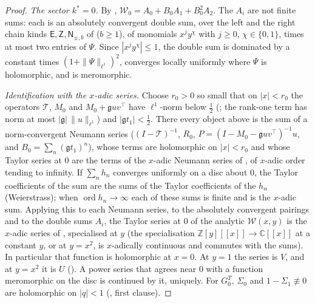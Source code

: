 \documentclass[11pt]{article}
\theoremstyle{plain}
\theoremstyle{definition}
\theoremstyle{remark}
\newcommand{\Z}{\mathbb{Z}}
\newcommand{\C}{\mathbb{C}}
\theoremstyle{plain}\newtheorem*{maintheorem}{Main Theorem}
\begin{document}
\begin{proof}
\emph{The sector $k^\ast=0$.} By {\cite[Remark ``the regrouping of $\mathcal W_0$'', \textup{M3:rem:W0regroup}]{Bonfioli2026bB}},
$\mathcal W_0=A_0+B_0A_1+B_0^2A_2$. The $A_i$ are not finite sums: each is an absolutely convergent
double sum, over the left and the right chain kinds $\mathsf E,\mathsf Z,\mathsf N_{\pm,b}$ of
{\cite[\textup{(eq:app-W0)}]{Bonfioli2026bB}} ($b\ge1$), of monomials $x^jy^\chi$ with $j\ge0$, $\chi\in\{0,1\}$, times at most
two entries of $\Psi$. Since $|x^jy^\chi|\le1$, the double sum is dominated by a constant times
$(1+\|\Psi\|_{\ell^1})^2$, converges locally uniformly where $\Psi$ is holomorphic, and is
meromorphic.

\emph{Identification with the $x$-adic series.} Choose $r_0>0$ so small that on $|x|<r_0$ the
operators $\mathcal T$, $M_0$ and $M_0+\mathfrak guv^{\!\top}$ have $\ell^1$-norm below $\tfrac12$
({\cite[Lemma ``existence, uniqueness, analyticity'', \textup{lem:modelexist}]{Bonfioli2026bB}}; the rank-one term has norm at most $|\mathfrak g|\,\|u\|_{\ell^1}$) and
$|\mathfrak gt_1|<\tfrac12$. There every object above is the sum
of a norm-convergent Neumann series ($(I-\mathcal T)^{-1}$, $R_0$, $P=(I-M_0-\mathfrak
guv^{\!\top})^{-1}u$, and $B_0=\sum_n(\mathfrak gt_1)^n$), whose terms are holomorphic on
$|x|<r_0$ and whose Taylor series at $0$ are the terms of the $x$-adic Neumann series of
{\cite[Lemma \textup{M3:lem:conv}]{Bonfioli2026bB}}, of $x$-adic order tending to infinity. If $\sum_nh_n$ converges uniformly
on a disc about $0$, the Taylor coefficients of the sum are the sums of the Taylor coefficients of
the $h_n$ (Weierstrass); when $\operatorname{ord}h_n\to\infty$ each of these sums is finite and is
the $x$-adic sum. Applying this to each Neumann series, to the absolutely convergent pairings and
to the double sums $A_i$, the Taylor series at $0$ of the analytic $\mathcal W(x,y)$ is the
$x$-adic series of {\cite[Theorem ``\textup{(M3$'$)}'', \textup{thm:M3prime}]{Bonfioli2026bB}}, specialised at $y$ (the specialisation
$\Z[y][[x]]\to\C[[x]]$ at a constant $y$, or at $y=x^2$, is $x$-adically continuous and commutes
with the sums). In particular that function is holomorphic at $x=0$. At $y=1$ the series is $V$,
and at $y=x^2$ it is $U$ ({\cite[Corollary \textup{cor:M3prime-growth}]{Bonfioli2026bB}}). A power series that agrees near $0$
with a function meromorphic on the disc is continued by it, uniquely. For $G^T_0$, $\Sigma_0$ and
$1-\Sigma_1\not\equiv0$ are holomorphic on $|q|<1$ ({\cite[Theorem \textup{thm:blocks}]{Bonfioli2026bB}}, first clause).
\end{proof}
\end{document}
